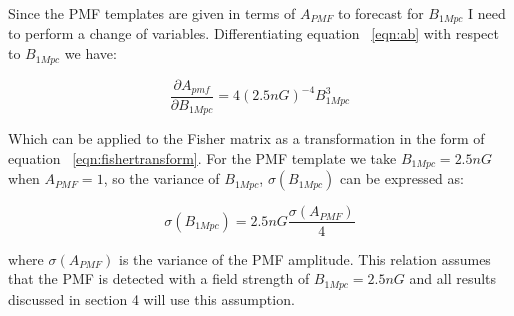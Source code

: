 Since the PMF templates are given in terms of $A_{PMF}$ to forecast for $B_{1Mpc}$ I need to perform a change of variables. Differentiating equation ~\ref{eqn:ab} with respect to $B_{1Mpc}$ we have:

\begin{equation}
\label{eqn:diffapmf}
\frac{\partial A_{pmf}}{\partial B_{1Mpc}} = 4(2.5nG)^{-4}B_{1Mpc}^3
\end{equation}
 
Which can be applied to the Fisher matrix as a transformation in the form of equation ~\ref{eqn:fishertransform}.
For the PMF template we take $B_{1Mpc} = 2.5nG$ when $A_{PMF} = 1$, so
the variance of $B_{1Mpc}$, $\sigma(B_{1Mpc})$ can be expressed as:

\begin{equation}
\label{eqn:sigmab1mpc}
\sigma(B_{1Mpc}) = 2.5nG\frac{\sigma(A_{PMF})}{4}
\end{equation}

where $\sigma(A_{PMF})$ is the variance of the PMF amplitude. This relation assumes that the PMF is detected with a field strength of $B_{1Mpc} = 2.5nG$ and all results discussed in section 4 will use this assumption.
